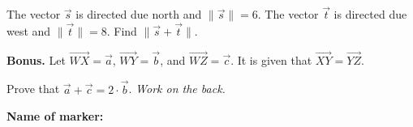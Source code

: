 \documentclass[9pt]{exam}
\begin{document}
\begin{questions}

\question[5] The vector $\overrightarrow{s}$ is directed due north and $\| \overrightarrow{s} \|  = 6$.  
The vector $\overrightarrow{t}$ is directed due west and $\| \overrightarrow{t} \|  = 8$. 
Find $\| \overrightarrow{s}  + \overrightarrow{t}\|$.
\fillwithdottedlines{5cm}

\vfill

\question[0] \textbf{Bonus.} Let $\overrightarrow{WX} = \overrightarrow{a}$, $\overrightarrow{WY} = \overrightarrow{b}$, and $\overrightarrow{WZ} = \overrightarrow{c}$. It is given that $\overrightarrow{XY} = \overrightarrow{YZ}$.

Prove that $\overrightarrow{a} + \overrightarrow{c} = 2 \cdot \overrightarrow{b}$. \hfill \emph{Work on the back.}

\end{questions}


\begin{tcolorbox}

\textbf{Name of marker:}

\begin{center}
\gradetable[h][questions]
\end{center}

\end{tcolorbox}
\end{document}
